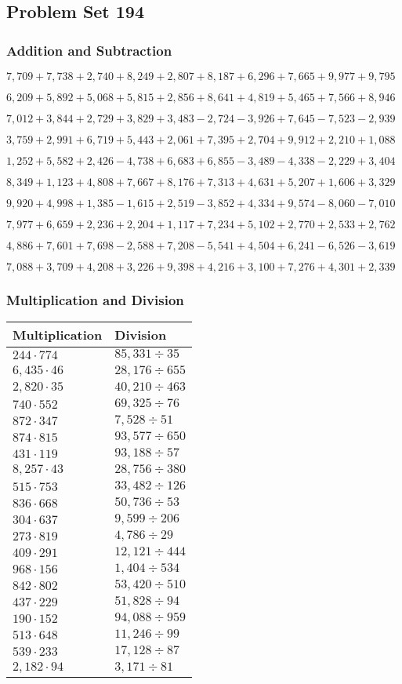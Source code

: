 \hypertarget{problem-set-194}{%
\subsection{Problem Set 194}\label{problem-set-194}}

\hypertarget{addition-and-subtraction}{%
\subsubsection{Addition and
Subtraction}\label{addition-and-subtraction}}

\(7,709+7,738+2,740+8,249+2,807+8,187+6,296+7,665+9,977+9,795\)

\(6,209+5,892+5,068+5,815+2,856+8,641+4,819+5,465+7,566+8,946\)

\(7,012+3,844+2,729+3,829+3,483-2,724-3,926+7,645-7,523-2,939\)

\(3,759+2,991+6,719+5,443+2,061+7,395+2,704+9,912+2,210+1,088\)

\(1,252+5,582+2,426-4,738+6,683+6,855-3,489-4,338-2,229+3,404\)

\(8,349+1,123+4,808+7,667+8,176+7,313+4,631+5,207+1,606+3,329\)

\(9,920+4,998+1,385-1,615+2,519-3,852+4,334+9,574-8,060-7,010\)

\(7,977+6,659+2,236+2,204+1,117+7,234+5,102+2,770+2,533+2,762\)

\(4,886+7,601+7,698-2,588+7,208-5,541+4,504+6,241-6,526-3,619\)

\(7,088+3,709+4,208+3,226+9,398+4,216+3,100+7,276+4,301+2,339\)

\hypertarget{multiplication-and-division}{%
\subsubsection{Multiplication and
Division}\label{multiplication-and-division}}

\begin{longtable}[]{@{}ll@{}}
\toprule
Multiplication & Division\tabularnewline
\midrule
\endhead
\(244\cdot774\) & \(85,331÷35\)\tabularnewline
\(6,435\cdot46\) & \(28,176÷655\)\tabularnewline
\(2,820\cdot35\) & \(40,210÷463\)\tabularnewline
\(740\cdot552\) & \(69,325÷76\)\tabularnewline
\(872\cdot347\) & \(7,528÷51\)\tabularnewline
\(874\cdot815\) & \(93,577÷650\)\tabularnewline
\(431\cdot119\) & \(93,188÷57\)\tabularnewline
\(8,257\cdot43\) & \(28,756÷380\)\tabularnewline
\(515\cdot753\) & \(33,482÷126\)\tabularnewline
\(836\cdot668\) & \(50,736÷53\)\tabularnewline
\(304\cdot637\) & \(9,599÷206\)\tabularnewline
\(273\cdot819\) & \(4,786÷29\)\tabularnewline
\(409\cdot291\) & \(12,121÷444\)\tabularnewline
\(968\cdot156\) & \(1,404÷534\)\tabularnewline
\(842\cdot802\) & \(53,420÷510\)\tabularnewline
\(437\cdot229\) & \(51,828÷94\)\tabularnewline
\(190\cdot152\) & \(94,088÷959\)\tabularnewline
\(513\cdot648\) & \(11,246÷99\)\tabularnewline
\(539\cdot233\) & \(17,128÷87\)\tabularnewline
\(2,182\cdot94\) & \(3,171÷81\)\tabularnewline
\bottomrule
\end{longtable}
